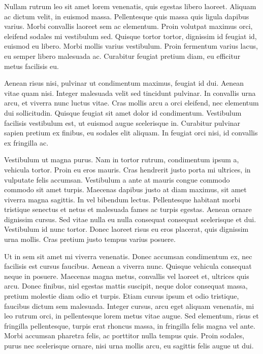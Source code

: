 \documentclass{article}
\begin{document}
Nullam rutrum leo sit amet lorem venenatis, quis egestas libero laoreet. Aliquam ac dictum velit, in euismod massa. Pellentesque quis massa quis ligula dapibus varius. Morbi convallis laoreet sem ac elementum. Proin volutpat maximus orci, eleifend sodales mi vestibulum sed. Quisque tortor tortor, dignissim id feugiat id, euismod eu libero. Morbi mollis varius vestibulum. Proin fermentum varius lacus, eu semper libero malesuada ac. Curabitur feugiat pretium diam, eu efficitur metus facilisis eu.

Aenean risus nisi, pulvinar ut condimentum maximus, feugiat id dui. Aenean vitae quam nisi. Integer malesuada velit sed tincidunt pulvinar. In convallis urna arcu, et viverra nunc luctus vitae. Cras mollis arcu a orci eleifend, nec elementum dui sollicitudin. Quisque feugiat sit amet dolor id condimentum. Vestibulum facilisis vestibulum est, ut euismod augue scelerisque in. Curabitur pulvinar sapien pretium ex finibus, eu sodales elit aliquam. In feugiat orci nisi, id convallis ex fringilla ac.

Vestibulum ut magna purus. Nam in tortor rutrum, condimentum ipsum a, vehicula tortor. Proin eu eros mauris. Cras hendrerit justo porta mi ultrices, in vulputate felis accumsan. Vestibulum a ante at mauris congue commodo commodo sit amet turpis. Maecenas dapibus justo at diam maximus, sit amet viverra magna sagittis. In vel bibendum lectus. Pellentesque habitant morbi tristique senectus et netus et malesuada fames ac turpis egestas. Aenean ornare dignissim cursus. Sed vitae nulla eu nulla consequat consequat scelerisque et dui. Vestibulum id nunc tortor. Donec laoreet risus eu eros placerat, quis dignissim urna mollis. Cras pretium justo tempus varius posuere.

Ut in sem sit amet mi viverra venenatis. Donec accumsan condimentum ex, nec facilisis est cursus faucibus. Aenean a viverra nunc. Quisque vehicula consequat neque in posuere. Maecenas magna metus, convallis vel laoreet et, ultrices quis arcu. Donec finibus, nisl egestas mattis suscipit, neque dolor consequat massa, pretium molestie diam odio et turpis. Etiam cursus ipsum et odio tristique, faucibus dictum sem malesuada. Integer cursus, arcu eget aliquam venenatis, mi leo rutrum orci, in pellentesque lorem metus vitae augue. Sed elementum, risus et fringilla pellentesque, turpis erat rhoncus massa, in fringilla felis magna vel ante. Morbi accumsan pharetra felis, ac porttitor nulla tempus quis. Proin sodales, purus nec scelerisque ornare, nisi urna mollis arcu, eu sagittis felis augue ut dui.
\end{document}

